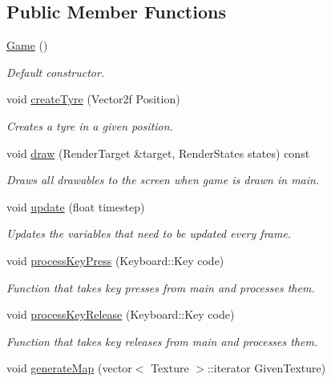 \subsection*{Public Member Functions}
\begin{DoxyCompactItemize}
\item 
\hyperlink{class_game_ad59df6562a58a614fda24622d3715b65}{Game} ()
\begin{DoxyCompactList}\small\item\em Default constructor. \end{DoxyCompactList}\item 
void \hyperlink{class_game_a8eb2aefb1a563b1ca91d080131e0f1a3}{create\+Tyre} (Vector2f Position)
\begin{DoxyCompactList}\small\item\em Creates a tyre in a given position. \end{DoxyCompactList}\item 
void \hyperlink{class_game_a260c4d5123eb3a51cbd0bb685546cef4}{draw} (Render\+Target \&target, Render\+States states) const 
\begin{DoxyCompactList}\small\item\em Draws all drawables to the screen when game is drawn in main. \end{DoxyCompactList}\item 
void \hyperlink{class_game_acc8519c7ced1cf9eb9bbb3a2f325f6a0}{update} (float timestep)
\begin{DoxyCompactList}\small\item\em Updates the variables that need to be updated every frame. \end{DoxyCompactList}\item 
void \hyperlink{class_game_ad3053e3b15bbcb049dc040801d58be7c}{process\+Key\+Press} (Keyboard\+::\+Key code)
\begin{DoxyCompactList}\small\item\em Function that takes key presses from main and processes them. \end{DoxyCompactList}\item 
void \hyperlink{class_game_adb2ea3b70e0038d2caceedfde3bfc663}{process\+Key\+Release} (Keyboard\+::\+Key code)
\begin{DoxyCompactList}\small\item\em Function that takes key releases from main and processes them. \end{DoxyCompactList}\item 
void \hyperlink{class_game_a917e25c51c6b20c74e9f9a441c72717e}{generate\+Map} (vector$<$ Texture $>$\+::iterator Given\+Texture)

\end{DoxyCompactItemize}
